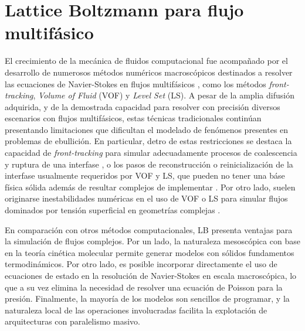 \section{Lattice Boltzmann para flujo multif\'asico}
El crecimiento de la mec\'anica de fluidos computacional fue acompa\~nado por el desarrollo de numerosos m\'etodos num\'ericos macrosc\'opicos destinados a resolver las ecuaciones de Navier-Stokes en flujos multif\'asicos \cite{scardovelli_direct_1999}, como los m\'etodos \emph{front-tracking}, \emph{Volume of Fluid} (VOF) y \emph{Level Set} (LS). A pesar de la amplia difusi\'on adquirida, y de la demostrada capacidad para resolver con precisi\'on diversos escenarios con flujos multif\'asicos, estas t\'ecnicas tradicionales contin\'uan presentando limitaciones que dificultan el modelado de fen\'omenos presentes en problemas de ebullici\'on. En particular, detro de estas restricciones se destaca la capacidad de \emph{front-tracking} para simular adecuadamente procesos de coalescencia y ruptura de una interfase \cite{scardovelli_direct_1999,liu_three-dimensional_2012}, o los pasos de reconstrucci\'on o reinicializaci\'on de la interfase usualmente requeridos por VOF y LS, que pueden no tener una b\'ase f\'isica s\'olida adem\'as de resultar complejos de implementar \cite{liu_three-dimensional_2012}. Por otro lado, suelen originarse inestabilidades num\'ericas en el uso de VOF o LS para simular flujos dominados por tensi\'on superficial en geometr\'ias complejas \cite{scardovelli_direct_1999}.
\par
En comparaci\'on con otros m\'etodos computacionales, LB presenta ventajas para la simulaci\'on de flujos complejos. Por un lado, la naturaleza mesosc\'opica con base en la teor\'ia cin\'etica molecular permite generar modelos con s\'olidos fundamentos termodin\'amicos. Por otro lado, es posible incorporar directamente el uso de ecuaciones de estado en la resoluci\'on de Navier-Stokes en escala macrosc\'opica, lo que a su vez elimina la necesidad de resolver una ecuaci\'on de Poisson para la presi\'on. Finalmente, la mayor\'ia de los modelos son sencillos de programar, y la naturaleza local de las operaciones involucradas facilita la explotaci\'on de arquitecturas con paralelismo masivo.

